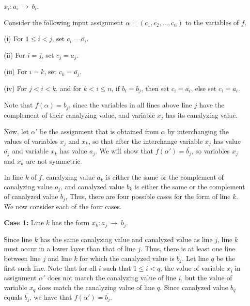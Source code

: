 \smallskip

\hspace*{1in}
$x_i : a_i ~\longrightarrow~ b_i$. 

\smallskip

\noindent
Consider the following input assignment $\alpha = (c_1, c_2, \ldots,  c_n)$ 
to the variables of $f$.
\begin{description}
\item{(i)} For $1 \leq i < j$, set $c_i = \overline{a_i}$. 
\item{(ii)} For $i = j$, set $c_j =a_j$. 
\item{(iii)} For $i = k$, set $c_k =\overline{a_j}$. 
\item{(iv)} For $j < i < k$, and for  $k < i \leq n$, 
if $b_i = b_j$, then set $c_i =  \overline{a_i}$,
else set $c_i =  a_i$.
\end{description}
Note that $f(\alpha) = b_j$, since the variables in all lines above
line $j$ have the complement of their canalyzing value, and variable
$x_j$ has its canalyzing value.

\medskip

Now, let $\alpha'$ be the assignment that is obtained from $\alpha$
by interchanging the values of variables $x_j$ and $x_k$, so that
after the interchange variable $x_j$ has value $\overline{a_j}$ and
variable $x_k$ has value $a_j$.  We will show that $f(\alpha') =
\overline{b_j}$, so variables $x_j$ and $x_k$ are not symmetric.

In line $k$ of $f$, canalyzing value $a_k$ is either the same or
the complement of canalyzing value $a_j$, and canalyzed value $b_k$
is either the same or the complement of canalyzed value $b_j$,
Thus, there are four possible cases for the form of line $k$.  We
now consider each of the four cases.

\medskip

\noindent
{\bf Case 1:} Line $k$ has the form $x_k : a_j ~\longrightarrow~ b_j$.  

\smallskip

Since line $k$ has
the same canalyzing value and canalyzed value as line $j$, line
$k$ must occur in a lower layer than that of line $j$.  Thus, there
is at least one line between line $j$ and line $k$ for which the
canalyzed value is $\overline{b_j}$.  Let line $q$ be the first
such line.  Note that for all $i$ such that $1 \leq i < q$, the
value of variable $x_i$ in assignment $\alpha'$ does not match the
canalyzing value of line $i$, but the value of variable $x_q$ does
match the canalyzing value of line $q$.  Since canalyzed value
$b_q$ equals $\overline{b_j}$, we have that $f(\alpha') =
\overline{b_j}$.

